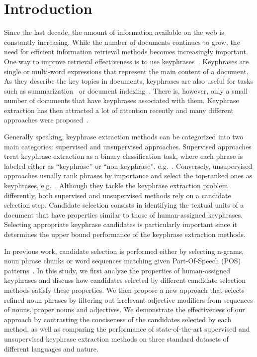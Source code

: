 \section{Introduction}
\label{sec:section}

  Since the last decade, the amount of information available on the web is
  constantly increasing. While the number of documents continues to grow, the
  need for efficient information retrieval methods becomes increasingly
  important. One way to improve retrieval effectiveness is to use
  keyphrases~\cite{jones1999phrasier}. Keyphrases are single or multi-word
  expressions that represent the main content of a document. As they describe
  the key topics in documents, keyphrases are also useful for tasks such as
  summarization~\cite{avanzo2005keyphrase} or document
  indexing~\cite{medelyan2008smalltrainingset}. There is, however, only a small
  number of documents that have keyphrases associated with them. Keyphrase
  extraction has then attracted a lot of attention recently and many different
  approaches were proposed~\cite{kim2010semeval}.

  Generally speaking, keyphrase extraction methods can be categorized into two
  main categories: supervised and unsupervised approaches. Supervised approaches
  treat keyphrase extraction as a binary classification task, where each phrase
  is labeled either as ``keyphrase'' or ``non-keyphrase'',
  e.g.~\cite{witten1999kea}. Conversely, unsupervised approaches usually rank
  phrases by importance and select the top-ranked ones as keyphrases,
  e.g.~\cite{mihalcea2004textrank}. Although they tackle the keyphrase
  extraction problem differently, both supervised and unsupervised methods rely
  on a candidate selection step. Candidate selection consists in identifying the
  textual units of a document that have properties similar to those of
  human-assigned keyphrases. Selecting appropriate keyphrase candidates is
  particularly important since it determines the upper bound performance of the
  keyphrase extraction methods.

  In previous work, candidate selection is performed either by selecting
  n-grams, noun phrase chunks or word sequences matching given Part-Of-Speech
  (POS) patterns~\cite{hulth2003keywordextraction}. In this study, we first
  analyze the properties of human-assigned keyphrases and discuss how candidates
  selected by different candidate selection methods satisfy these properties. We
  then propose a new approach that selects refined noun phrases by filtering out
  irrelevant adjective modifiers from sequences of nouns, proper nouns and
  adjectives. We demonstrate the effectiveness of our approach by contrasting
  the conciseness of the candidates selected by each method, as well as
  comparing the performance of state-of-the-art supervised and unsupervised
  keyphrase extraction methods on three standard datasets of different languages
  and nature.

